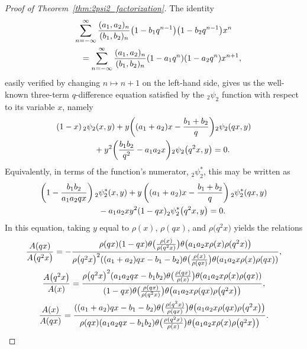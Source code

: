 \documentclass[10pt,a4paper]{amsart}
\numberwithin{equation}{section}
\begin{document}
\begin{proof}[Proof of Theorem~\ref{thm:2psi2_factorization}]
The identity
\begin{gather}
\sum_{n=-\infty}^\infty {(a_1,a_2)_n \over (b_1,b_2)_n} \bigl(1-b_1q^{n-1}\bigr)\bigl(1-b_2q^{n-1}\bigr) x^n\nonumber\\
\qquad = \sum_{n=-\infty}^\infty {(a_1,a_2)_n \over (b_1,b_2)_n} (1-a_1q^n)(1-a_2q^n) x^{n+1},\label{eqn:elementary_2psi2_shift}
\end{gather}
easily verified by changing $n \mapsto n+1$ on the left-hand side, gives us the well-known three-term $q$-difference equation satisfied by the $_2\psi_2$ function with respect to its variable $x$, namely
\begin{gather*}
 (1-x)\,{}_2\psi_2(x,y) + y\bigg( (a_1+a_2)x - {b_1+b_2 \over q} \bigg) {}_2\psi_2(qx,y) \\
 \qquad{} + y^2 \bigg( {b_1b_2 \over q^2} - a_1a_2x \bigg) {}_2\psi_2\bigl(q^2x,y\bigr)
 =0.
 \end{gather*}
Equivalently, in terms of the function's numerator, ${}_2^{}\psi_2^\ast$, this may be written as
\begin{gather}
\left(1-{b_1b_2 \over a_1a_2qx}\right){}_2^{}\psi_2^\ast(x,y) + y\left( (a_1+a_2)x - {b_1+b_2 \over q} \right) {}_2^{}\psi_2^\ast(qx,y)\nonumber \\
\qquad{}-a_1a_2xy^2 (1-qx) {}_2^{}\psi_2^\ast\bigl(q^2x,y\bigr) =0.\label{eqn:2psi2ast_functional_eqn_wrt_x}
\end{gather}
In this equation, taking $y$ equal to $\rho(x)$, $\rho(qx)$, and $\rho\bigl(q^2x\bigr)$ yields the relations
\begin{gather}
{A(qx) \over A\bigl(q^2x\bigr)} = -{\rho(qx)(1-qx)\theta\bigl({\rho(x) \over \rho(q^2x)}\bigr) \theta\bigl(a_1a_2x\rho(x)\rho(q^2x)\bigr) \over \rho\bigl(q^2x\bigr)^2 ((a_1+a_2)qx-b_1-b_2)\theta\bigl({\rho(x) \over \rho(qx)}\bigr) \theta(a_1a_2x\rho(x)\rho(qx))}, \label{eqn:A_rho_relation_1} \\
{A\bigl(q^2x\bigr) \over A(x)} = {\rho\bigl(q^2x\bigr)^2 (a_1a_2qx-b_1b_2) \theta\bigl({\rho(qx) \over \rho(x)}\bigr) \theta(a_1a_2x\rho(x)\rho(qx)) \over (1-qx)\theta\bigl({\rho(qx) \over \rho(q^2x)}\bigr) \theta\bigl(a_1a_2x\rho(qx)\rho\bigl(q^2x\bigr)\bigr)}, \label{eqn:A_rho_relation_2} \\
{A(x) \over A(qx)} = {((a_1+a_2)qx-b_1-b_2) \theta\bigl({\rho(q^2x) \over \rho(qx)}\bigr) \theta\bigl(a_1a_2x\rho(qx)\rho\bigl(q^2x\bigr)\bigr) \over \rho(qx) (a_1a_2qx-b_1b_2)\theta\bigl({\rho(q^2x) \over \rho(x)}\bigr) \theta\bigl(a_1a_2x\rho(x)\rho\bigl(q^2x\bigr)\bigr)}. \label{eqn:A_rho_relation_3}

\end{gather}
\end{proof}
\end{document}
